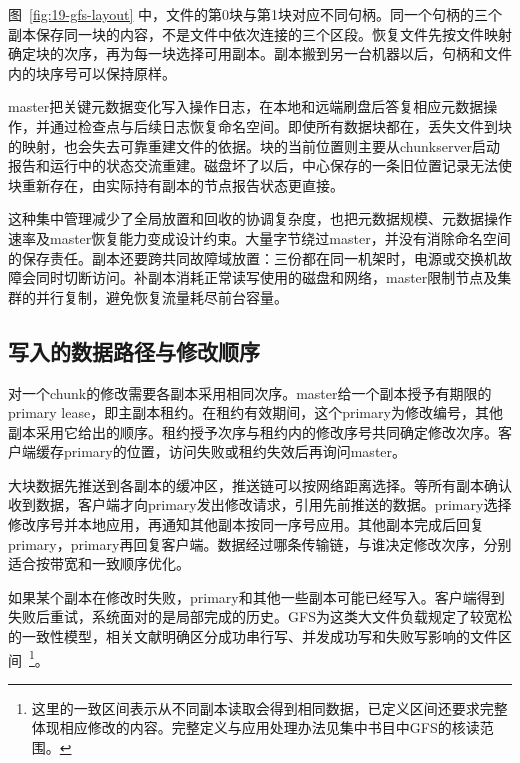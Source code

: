 
图~\ref{fig:19-gfs-layout} 中，文件的第0块与第1块对应不同句柄。同一个句柄的三个副本保存同一块的内容，不是文件中依次连接的三个区段。恢复文件先按文件映射确定块的次序，再为每一块选择可用副本。副本搬到另一台机器以后，句柄和文件内的块序号可以保持原样。

master把关键元数据变化写入操作日志，在本地和远端刷盘后答复相应元数据操作，并通过检查点与后续日志恢复命名空间。即使所有数据块都在，丢失文件到块的映射，也会失去可靠重建文件的依据。块的当前位置则主要从chunkserver启动报告和运行中的状态交流重建。磁盘坏了以后，中心保存的一条旧位置记录无法使块重新存在，由实际持有副本的节点报告状态更直接。

这种集中管理减少了全局放置和回收的协调复杂度，也把元数据规模、元数据操作速率及master恢复能力变成设计约束。大量字节绕过master，并没有消除命名空间的保存责任。副本还要跨共同故障域放置：三份都在同一机架时，电源或交换机故障会同时切断访问。补副本消耗正常读写使用的磁盘和网络，master限制节点及集群的并行复制，避免恢复流量耗尽前台容量。

\subsection{写入的数据路径与修改顺序}

对一个chunk的修改需要各副本采用相同次序。master给一个副本授予有期限的primary lease，即主副本租约。在租约有效期间，这个primary为修改编号，其他副本采用它给出的顺序。租约授予次序与租约内的修改序号共同确定修改次序。客户端缓存primary的位置，访问失败或租约失效后再询问master。

大块数据先推送到各副本的缓冲区，推送链可以按网络距离选择。等所有副本确认收到数据，客户端才向primary发出修改请求，引用先前推送的数据。primary选择修改序号并本地应用，再通知其他副本按同一序号应用。其他副本完成后回复primary，primary再回复客户端。数据经过哪条传输链，与谁决定修改次序，分别适合按带宽和一致顺序优化。


如果某个副本在修改时失败，primary和其他一些副本可能已经写入。客户端得到失败后重试，系统面对的是局部完成的历史。GFS为这类大文件负载规定了较宽松的一致性模型，相关文献明确区分成功串行写、并发成功写和失败写影响的文件区间~\cite{gfs2003}\footnote{这里的一致区间表示从不同副本读取会得到相同数据，已定义区间还要求完整体现相应修改的内容。完整定义与应用处理办法见集中书目中GFS的核读范围。}。

